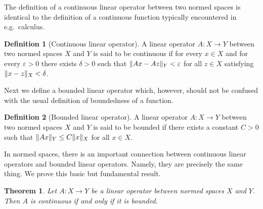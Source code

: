\documentclass[english, 12pt, a4paper, sci, utf8, a-2b, online]{aaltothesis}
\theoremstyle{definition}
\newtheorem{definition}{Definition}[section]
\theoremstyle{plain}
\newtheorem{theorem}{Theorem}[section]
\DeclarePairedDelimiter\norm{\lVert}{\rVert}
\numberwithin{equation}{section}
\begin{document}
The definition of a continuous linear operator between two normed spaces
is identical to the definition of a continuous function typically encountered
in e.g.\ calculus.
\begin{definition}[Continuous linear operator]
    \label{def:continuousoperator}
    A linear operator $A: X \to Y$ between two normed spaces
    $X$ and $Y$ is said to be continuous
    if for every $x \in X$ and for every $\varepsilon > 0$
    there exists $\delta > 0$ such that $\norm{Ax - Az}_Y < \varepsilon$
    for all $z \in X$ satisfying $\norm{x-z}_X < \delta$.
\end{definition}
Next we define a bounded linear operator which, however, should not be confused
with the usual definition of boundedness of a function.
\begin{definition}[Bounded linear operator]
    \label{def:boundedness}
    A linear operator $A: X \to Y$ between two normed spaces
    $X$ and $Y$ is said to be bounded
    if there exists a constant $C > 0$ such that
    $\norm{Ax}_Y \leq C \norm{x}_X$ for all $x \in X$.
\end{definition}
In normed spaces, there is an important connection between
continuous linear operators and bounded linear operators.
Namely, they are precisely the same thing.
We prove this basic but fundamental result.
\begin{theorem}
    \label{thm:boundedcontinuous}
    Let $A: X \to Y$ be a linear operator between normed spaces $X$ and $Y$.
    Then $A$ is continuous if and only if it is bounded.
\end{theorem}
\end{document}
